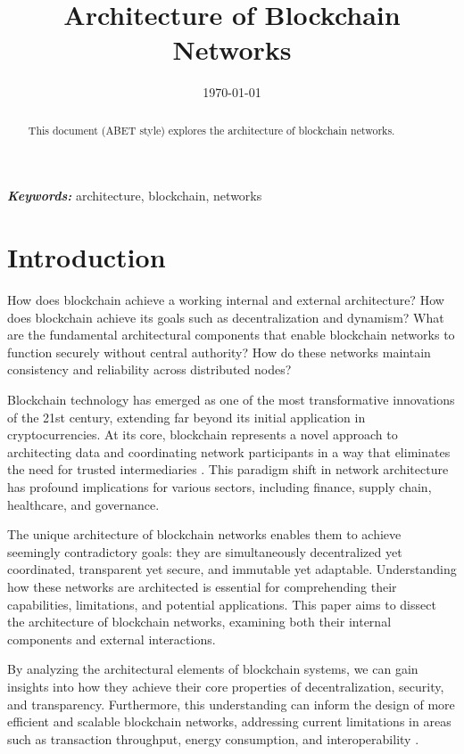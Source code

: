 \documentclass[twoside]{article}
\begin{document}

\title{Architecture of Blockchain Networks}
\author{}
\date{\today}
\maketitle

\begin{abstract}
  \raggedright
  This document (ABET style) explores the architecture of blockchain networks.
\end{abstract}

\begin{justify}
  \textbf{\textit{Keywords:}} architecture, blockchain, networks
\end{justify}

\section{Introduction}
How does blockchain achieve a working internal and external architecture? How does blockchain achieve its goals such as decentralization and dynamism? What are the fundamental architectural components that enable blockchain networks to function securely without central authority? How do these networks maintain consistency and reliability across distributed nodes?

Blockchain technology has emerged as one of the most transformative innovations of the 21st century, extending far beyond its initial application in cryptocurrencies. At its core, blockchain represents a novel approach to architecting data and coordinating network participants in a way that eliminates the need for trusted intermediaries \cite{reasearchgate}. This paradigm shift in network architecture has profound implications for various sectors, including finance, supply chain, healthcare, and governance.

The unique architecture of blockchain networks enables them to achieve seemingly contradictory goals: they are simultaneously decentralized yet coordinated, transparent yet secure, and immutable yet adaptable. Understanding how these networks are architected is essential for comprehending their capabilities, limitations, and potential applications. This paper aims to dissect the architecture of blockchain networks, examining both their internal components and external interactions.

By analyzing the architectural elements of blockchain systems, we can gain insights into how they achieve their core properties of decentralization, security, and transparency. Furthermore, this understanding can inform the design of more efficient and scalable blockchain networks, addressing current limitations in areas such as transaction throughput, energy consumption, and interoperability \cite{patnaik}.
\end{document}
